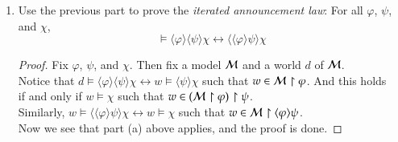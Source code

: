 \documentclass[11pt]{article}
\renewcommand{\phi}{\varphi}
\newcommand{\iiff}{\leftrightarrow}
\newcommand{\pair}[1]{\langle #1\rangle}
\begin{document}
\begin{enumerate}
\begin{enumerate}
\begin{proof}
  This finishes the proof of set equality and shows the two models $(\Model \upharpoonright \phi) \upharpoonright  \psi $ and $ \Model  \upharpoonright \pair{\phi}\psi$
are the same.
\end{proof}

\newpage

\item Use the previous part to prove the \emph{iterated announcement law}:
For all $\phi$, $\psi$, and $\chi$,
\[
\models \pair{\phi}\pair{\psi}\chi \iiff \pair{\pair{\phi}\psi}\chi
\]


\begin{proof}
  Fix $\phi$, $\psi$, and $\chi$. Then fix a model ${\cal M}$ and a world $d$ of ${\cal M}$.\\
  Notice that $d \models \pair{\phi}\pair{\psi}\chi \iiff w \models \pair{\psi}\chi$ such that $w \in \Model \upharpoonright \phi$.
  And this holds \\ if and only if $w \models \chi$ such that $w \in (\Model \upharpoonright \phi) \upharpoonright \psi$.\\
  Similarly, $w \models \pair{\pair{\phi}\psi}\chi \iiff w \models \chi$ such that $w \in \Model \upharpoonright \pair{\phi}\psi$. \\
  Now we see that part (a) above applies, and the proof is done.
\end{proof}

\end{enumerate}
\end{enumerate}
\end{document}
